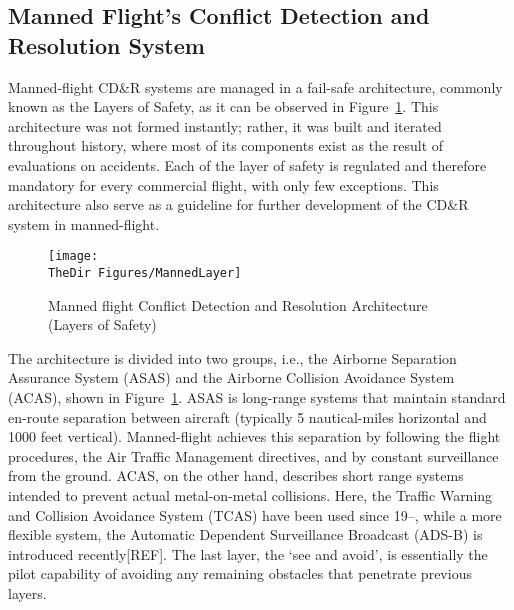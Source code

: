\subsection{Manned Flight's Conflict Detection and Resolution System}
Manned-flight CD\&R systems are managed in a fail-safe architecture, commonly known as the Layers of Safety, as it can be observed in Figure~\ref{f:MannedLayer}\cite{Dalamagkidis:09}. This architecture was not formed instantly; rather, it was built and iterated throughout history, where most of its components exist as the result of evaluations on accidents\cite{Kochenderfer:12}. Each of the layer of safety is regulated and therefore mandatory for every commercial flight, with only few exceptions. This architecture also serve as a guideline for further development of the CD\&R system in manned-flight.

\begin{figure}[h!]
	\begin{center}
		\texttt{[image: \\TheDir Figures/MannedLayer]}
	\end{center}
	\caption{Manned flight Conflict Detection and Resolution Architecture (Layers of Safety)} %
	\label{f:MannedLayer}
\end{figure}

The architecture is divided into two groups, i.e., the Airborne Separation Assurance System (ASAS) and the Airborne Collision Avoidance System (ACAS), shown in Figure~\ref{f:MannedLayer}. ASAS is long-range systems that maintain standard en-route separation between aircraft (typically 5 nautical-miles horizontal and 1000 feet vertical). Manned-flight achieves this separation by following the flight procedures, the Air Traffic Management directives, and by constant surveillance from the ground. ACAS, on the other hand, describes short range systems intended to prevent actual metal-on-metal collisions\cite{Hoekstra:01}. Here, the Traffic Warning and Collision Avoidance System (TCAS) have been used since 19--\cite{Kochenderfer:12}, while a more flexible system, the Automatic Dependent Surveillance Broadcast (ADS-B) is introduced recently[REF]. The last layer, the ‘see and avoid’, is essentially the pilot capability of avoiding any remaining obstacles that penetrate previous layers.

